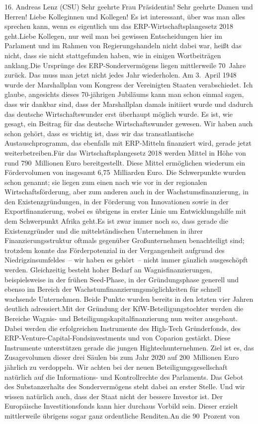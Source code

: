 \documentclass{article}
\begin{document}
	16. Andreas Lenz (CSU) Sehr geehrte Frau Präsidentin! Sehr geehrte Damen und Herren! Liebe Kolleginnen und Kollegen! Es ist interessant, über was man alles sprechen kann, wenn es eigentlich um das ERP-Wirtschaftsplangesetz 2018 geht.Liebe Kollegen, nur weil man bei gewissen Entscheidungen hier im Parlament und im Rahmen von Regierungshandeln nicht dabei war, heißt das nicht, dass sie nicht stattgefunden haben, wie in einigen Wortbeiträgen anklang.Die Ursprünge des ERP-Sondervermögens liegen mittlerweile 70 Jahre zurück. Das muss man jetzt nicht jedes Jahr wiederholen. Am 3. April 1948 wurde der Marshallplan vom Kongress der Vereinigten Staaten verabschiedet. Ich glaube, angesichts dieses 70-jährigen Jubiläums kann man schon einmal sagen, dass wir dankbar sind, dass der Marshallplan damals initiiert wurde und dadurch das deutsche Wirtschaftswunder erst überhaupt möglich wurde. Es ist, wie gesagt, ein Beitrag für das deutsche Wirtschaftswunder gewesen. Wir haben auch schon gehört, dass es wichtig ist, dass wir das transatlantische Austauschprogramm, das ebenfalls mit ERP-Mitteln finanziert wird, gerade jetzt weiterbetreiben.Für das Wirtschaftsplangesetz 2018 werden Mittel in Höhe von rund 790 Millionen Euro bereitgestellt. Diese Mittel ermöglichen wiederum ein Fördervolumen von insgesamt 6,75 Milliarden Euro. Die Schwerpunkte wurden schon genannt; sie liegen zum einen nach wie vor in der regionalen Wirtschaftsförderung, aber zum anderen auch in der Wachstumsfinanzierung, in den Existenzgründungen, in der Förderung von Innovationen sowie in der Exportfinanzierung, wobei es übrigens in erster Linie um Entwicklungshilfe mit dem Schwerpunkt Afrika geht.Es ist zwar immer noch so, dass gerade die Existenzgründer und die mittelständischen Unternehmen in ihrer Finanzierungsstruktur oftmals gegenüber Großunternehmen benachteiligt sind; trotzdem konnte das Förderpotenzial in der Vergangenheit aufgrund des Niedrigzinsumfeldes – wir haben es gehört – nicht immer gänzlich ausgeschöpft werden. Gleichzeitig besteht hoher Bedarf an Wagnisfinanzierungen, beispielsweise in der frühen Seed-Phase, in der Gründungsphase generell und ebenso im Bereich der Wachstumfinanzierungsmöglichkeiten für schnell wachsende Unternehmen. Beide Punkte wurden bereits in den letzten vier Jahren deutlich adressiert.Mit der Gründung der KfW-Beteiligungstochter werden die Bereiche Wagnis- und Beteiligungskapitalfinanzierung nun weiter ausgebaut. Dabei werden die erfolgreichen Instrumente des High-Tech Gründerfonds, des ERP-Venture-Capital-Fondsinvestments und von Coparion gestärkt. Diese Instrumente unterstützen gerade die jungen Hightechunternehmen. Ziel ist es, das Zusagevolumen dieser drei Säulen bis zum Jahr 2020 auf 200 Millionen Euro jährlich zu verdoppeln. Wir achten bei der neuen Beteiligungsgesellschaft natürlich auf die Informations- und Kontrollrechte des Parlaments. Das Gebot des Substanzerhalts des Sondervermögens steht dabei an erster Stelle. Und wir wissen natürlich auch, dass der Staat nicht der bessere Investor ist. Der Europäische Investitionsfonds kann hier durchaus Vorbild sein. Dieser erzielt mittlerweile übrigens sogar ganz ordentliche Renditen.An die 90 Prozent von 
\end{document}
